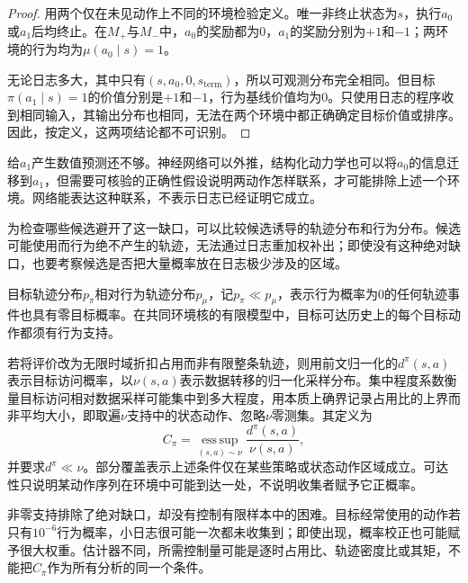 \begin{proof}
  用两个仅在未见动作上不同的环境检验定义。唯一非终止状态为$s$，执行$a_0$或$a_1$后均终止。在$M_+$与$M_-$中，$a_0$的奖励都为0，$a_1$的奖励分别为$+1$和$-1$；两环境的行为均为$\mu(a_0\mid s)=1$。

  无论日志多大，其中只有$(s,a_0,0,s_{\mathrm{term}})$，所以可观测分布完全相同。但目标$\pi(a_1\mid s)=1$的价值分别是$+1$和$-1$，行为基线价值均为0。只使用日志的程序收到相同输入，其输出分布也相同，无法在两个环境中都正确确定目标价值或排序。因此，按定义，这两项结论都不可识别。
\end{proof}

给$a_1$产生数值预测还不够。神经网络可以外推，结构化动力学也可以将$a_0$的信息迁移到$a_1$，但需要可核验的正确性假设说明两动作怎样联系，才可能排除上述一个环境。网络能表达这种联系，不表示日志已经证明它成立。

为检查哪些候选避开了这一缺口，可以比较候选诱导的轨迹分布和行为分布。候选可能使用而行为绝不产生的轨迹，无法通过日志重加权补出；即使没有这种绝对缺口，也要考察候选是否把大量概率放在日志极少涉及的区域。

\begin{definition}[支持、集中程度与部分覆盖]
  \label{def:rl-information-support}
  目标轨迹分布$p_\pi$相对行为轨迹分布$p_\mu$，记$p_\pi\ll p_\mu$，表示行为概率为0的任何轨迹事件也具有零目标概率。在共同环境核的有限模型中，目标可达历史上的每个目标动作都须有行为支持。

  若将评价改为无限时域折扣占用而非有限整条轨迹，则用前文归一化的$d^\pi(s,a)$表示目标访问概率，以$\nu(s,a)$表示数据转移的归一化采样分布。集中程度系数衡量目标访问相对数据采样可能集中到多大程度，用本质上确界记录占用比的上界而非平均大小，即取遍$\nu$支持中的状态动作、忽略$\nu$零测集。其定义为
  \[
    C_\pi=\operatorname*{ess\,sup}_{(s,a)\sim\nu}
               \frac{d^\pi(s,a)}{\nu(s,a)},
  \]
  并要求$d^\pi\ll\nu$。部分覆盖表示上述条件仅在某些策略或状态动作区域成立。可达性只说明某动作序列在环境中可能到达一处，不说明收集者赋予它正概率。
\end{definition}

非零支持排除了绝对缺口，却没有控制有限样本中的困难。目标经常使用的动作若只有$10^{-6}$行为概率，小日志很可能一次都未收集到；即使出现，概率校正也可能赋予很大权重。估计器不同，所需控制量可能是逐时占用比、轨迹密度比或其矩，不能把$C_\pi$作为所有分析的同一个条件。

